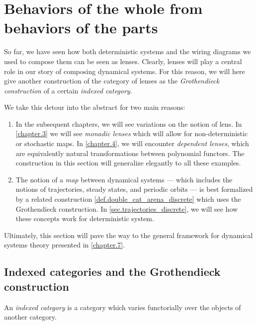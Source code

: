 \documentclass[DynamicalBook]{subfiles}
\begin{document}
\section{Behaviors of the whole from behaviors of the parts}\label{sec.representables}


  So far, we have seen how both deterministic systems and the wiring diagrams we
  used to compose them can be seen as lenses. Clearly, lenses will play a
  central role in our story of composing dynamical systems. For this reason, we
  will here give another construction of the category of lenses as the
  \emph{Grothendieck construction} of a certain \emph{indexed category}.

  We take this detour into the abstract for two main reasons:
  \begin{enumerate}
    \item In the subsequent chapters, we will see variations on the notion of
      lens. In \cref{chapter.3} we will see \emph{monadic lenses} which
      will allow for non-deterministic or stochastic maps. In \cref{chapter.4},
      we will encounter \emph{dependent lenses}, which are equivalently natural
      transformations between polynomial functors. The construction in this
      section will generalize elegantly to all these examples.
    \item The notion of a \emph{map} between dynamical systems --- which
      includes the notions of trajectories, steady states, and periodic orbits
      --- is best formalized by a related construction \cref{def.double_cat_arena_discrete} which uses the
      Grothendieck construction. In \cref{sec.trajectories_discrete}, we will
      see how these concepts work for deterministic system.
  \end{enumerate}
  Ultimately, this section will pave the way to the general framework for
  dynamical systems theory presented in \cref{chapter.7}.

\subsection{Indexed categories and the Grothendieck construction}\label{sec.indexed_categories}

An \emph{indexed category} is a category which varies functorially over the
objects of another category.
\end{document}
